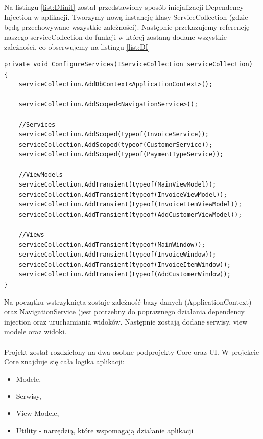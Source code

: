 Na listingu \ref{list:DIinit} został przedstawiony sposób inicjalizacji Dependency Injection w aplikacji. Tworzymy nową instancję klasy ServiceCollection (gdzie będą przechowywane wszystkie zależności). Następnie przekazujemy referencję naszego serviceCollection do funkcji w której zostaną dodane wszystkie zależności, co obserwujemy na listingu \ref{list:DI}

\begin{lstlisting}[language={[Sharp]C},label=list:DI,caption=Konfiguracja dependency injection, basicstyle=\footnotesize\ttfamily]
private void ConfigureServices(IServiceCollection serviceCollection)
{
    serviceCollection.AddDbContext<ApplicationContext>();
    
    serviceCollection.AddScoped<NavigationService>();

    //Services
    serviceCollection.AddScoped(typeof(InvoiceService));
    serviceCollection.AddScoped(typeof(CustomerService));
    serviceCollection.AddScoped(typeof(PaymentTypeService));

    //ViewModels
    serviceCollection.AddTransient(typeof(MainViewModel));
    serviceCollection.AddTransient(typeof(InvoiceViewModel));
    serviceCollection.AddTransient(typeof(InvoiceItemViewModel));
    serviceCollection.AddTransient(typeof(AddCustomerViewModel));

    //Views
    serviceCollection.AddTransient(typeof(MainWindow));
    serviceCollection.AddTransient(typeof(InvoiceWindow));
    serviceCollection.AddTransient(typeof(InvoiceItemWindow));
    serviceCollection.AddTransient(typeof(AddCustomerWindow));
}
\end{lstlisting}

Na początku wstrzyknięta zostaje zależność bazy danych (ApplicationContext) oraz NavigationService (jest potrzebny do poprawnego działania dependency injection oraz uruchamiania widoków. Następnie zostają dodane serwisy, view modele oraz widoki. 
\\\\
Projekt został rozdzielony na dwa osobne podprojekty Core oraz UI. W projekcie Core znajduje się cała logika aplikacji:
\begin{itemize}
    \item Modele,
    \item Serwisy,
    \item View Modele,
    \item Utility - narzędzią, które wspomagają działanie aplikacji
\end{itemize}


